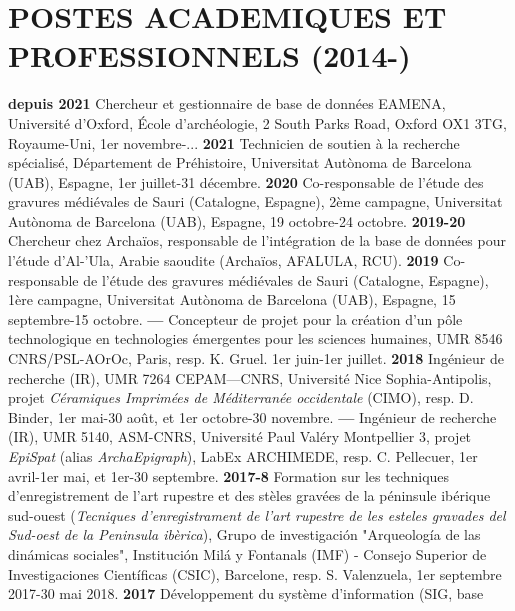 \documentclass{article}
\begin{document}
\section{POSTES ACADEMIQUES ET PROFESSIONNELS (2014-)}

\textbf{depuis 2021 }Chercheur et gestionnaire de base de données EAMENA, Université d'Oxford, École d'archéologie, 2 South Parks Road, Oxford OX1 3TG, Royaume-Uni, 1er novembre-...
\smallbreak
\textbf{2021 }Technicien de soutien à la recherche spécialisé, Département de Préhistoire, Universitat Autònoma de Barcelona (UAB), Espagne, 1er juillet-31 décembre.
\smallbreak
\textbf{2020 }Co-responsable de l'étude des gravures médiévales de Sauri (Catalogne, Espagne), 2ème campagne, Universitat Autònoma de Barcelona (UAB), Espagne, 19 octobre-24 octobre.
\smallbreak
\textbf{2019-20 }Chercheur chez Archaïos, responsable de l'intégration de la base de données pour l'étude d'Al-'Ula, Arabie saoudite (Archaïos, AFALULA, RCU).
\smallbreak
\textbf{2019 }Co-responsable de l'étude des gravures médiévales de Sauri (Catalogne, Espagne), 1ère campagne, Universitat Autònoma de Barcelona (UAB), Espagne, 15 septembre-15 octobre.
\smallbreak
\textbf{--- }Concepteur de projet pour la création d'un pôle technologique en technologies émergentes pour les sciences humaines, UMR 8546 CNRS/PSL-AOrOc, Paris, resp. K. Gruel. 1er juin-1er juillet.
\smallbreak
\textbf{2018 }Ingénieur de recherche (IR), UMR 7264 CEPAM---CNRS, Université Nice Sophia-Antipolis, projet \textit{Céramiques Imprimées de Méditerranée occidentale} (CIMO), resp. D. Binder, 1er mai-30 août, et 1er octobre-30 novembre.
\smallbreak
\textbf{--- }Ingénieur de recherche (IR), UMR 5140, ASM-CNRS, Université Paul Valéry Montpellier 3, projet \textit{EpiSpat} (alias \textit{ArchaEpigraph}), LabEx ARCHIMEDE, resp. C. Pellecuer, 1er avril-1er mai, et 1er-30 septembre.
\smallbreak
\textbf{2017-8 }Formation sur les techniques d'enregistrement de l'art rupestre et des stèles gravées de la péninsule ibérique sud-ouest (\textit{Tecniques d'enregistrament de l'art rupestre de les esteles gravades del Sud-oest de la Peninsula ibèrica}), Grupo de investigación "Arqueología de las dinámicas sociales", Institución Milá y Fontanals (IMF) - Consejo Superior de Investigaciones Científicas (CSIC), Barcelone, resp. S. Valenzuela, 1er septembre 2017-30 mai 2018.
\smallbreak
\textbf{2017 }Développement du système d'information (SIG, base
\end{document}
